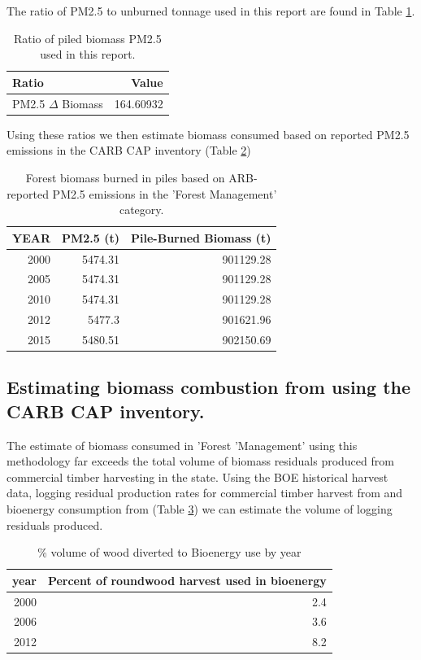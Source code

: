 \documentclass[a4paper]{article}
\begin{document}
The ratio of \ac{PM2.5} to unburned tonnage used in this report are found in Table \ref{tab:pm_ratios}. 

\begin{table}[htb]
\centering
\begin{tabular}{lr}
Ratio & Value\\
\hline
\ac{PM2.5} \(\Delta\) Biomass & 164.60932\\
\end{tabular}
\caption{Ratio of piled biomass \ac{PM2.5} used in this report. \label{tab:pm_ratios}}

\end{table}


Using these ratios we then estimate biomass consumed based on reported \ac{PM2.5} emissions in the \ac{CARB} \ac{CAP} inventory (Table \ref{tab:cap_biomass})

\begin{table}[htb]
\centering
\begin{tabular}{rrr}
YEAR & PM2.5 (t) & Pile-Burned Biomass (t)\\
\hline
2000 & 5474.31 & 901129.28\\
2005 & 5474.31 & 901129.28\\
2010 & 5474.31 & 901129.28\\
2012 & 5477.3 & 901621.96\\
2015 & 5480.51 & 902150.69\\
\end{tabular}
\caption{Forest biomass burned in piles based on ARB-reported PM2.5 emissions in the 'Forest Management' category. \label{tab:cap_biomass}}

\end{table}

\subsection{Estimating biomass combustion from using the \ac{CARB} \ac{CAP} inventory.}
\label{sec:orgheadline5}
The estimate of biomass consumed in 'Forest 'Management' using this methodology far exceeds the total volume of biomass residuals produced from commercial timber harvesting in the state. Using the \ac{BOE} historical harvest data, logging residual production rates for commercial timber harvest from \cite{Morgan} and bioenergy consumption from \cite{Mciver2012} (Table \ref{tab:bio_vol}) we can estimate the volume of logging residuals produced.

\begin{table}[htb]
\centering
\begin{tabular}{rr}
year & Percent of roundwood harvest used in bioenergy\\
\hline
2000 & 2.4\\
2006 & 3.6\\
2012 & 8.2\\
\end{tabular}
\caption{\% volume of wood diverted to Bioenergy use by year \label{tab:bio_vol}}

\end{table}
\end{document}

